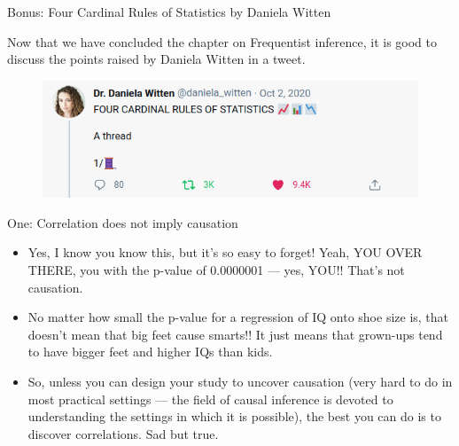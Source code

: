 \documentclass[handout]{beamer}
\begin{document}
\begin{frame}{Bonus: Four Cardinal Rules of Statistics by Daniela Witten}
\scriptsize{

Now that we have concluded the chapter on Frequentist inference, it is good to discuss the points raised by Daniela Witten in a tweet.

\begin{figure}[h!]
  \centering
  \includegraphics[scale=0.3]{pics/witten.png}
\end{figure}


\begin{block}{One: Correlation does not imply causation}
\begin{itemize}
 \item Yes, I know you know this, but it’s so easy to forget! Yeah, YOU OVER THERE, you with the p-value of 0.0000001 — yes, YOU!! That’s not causation.
 \item No matter how small the p-value for a regression of IQ onto shoe size is, that doesn’t mean that big feet cause smarts!!  It just means that grown-ups tend to have bigger feet and higher IQs than kids.
 \item So, unless you can design your study to uncover causation (very hard to do in most practical settings — the field of causal inference is devoted to understanding the settings in which it is possible), the best you can do is to discover correlations.  Sad but true.
\end{itemize}

 
\end{block}




} 
\end{frame}
\end{document}
